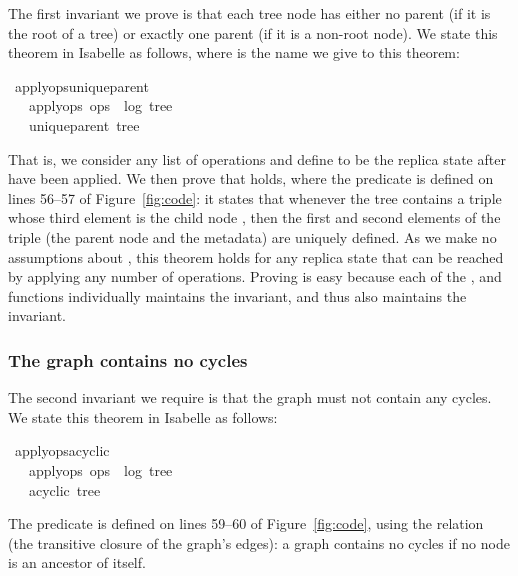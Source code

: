 \documentclass[sigconf]{acmart}
\renewenvironment{isabelle}{%
  \medbreak\noindent%
  \renewcommand{\isanewline}{\\}%
  \begin{minipage}{\columnwidth}%
  \begin{isabellebody}%
  \begin{tabbing}%
}{%
  \end{tabbing}%
  \end{isabellebody}%
  \end{minipage}%
  \medbreak%
}
\renewcommand{\isacartoucheopen}{}
\renewcommand{\isacartoucheclose}{}
\begin{document}
The first invariant we prove is that each tree node has either no parent (if it is the root of a tree) or exactly one parent (if it is a non-root node).
We state this theorem in Isabelle as follows, where  is the name we give to this theorem:
\begin{isabelle}
\isamarkupfalse%
\ apply{\isacharunderscore}ops{\isacharunderscore}unique{\isacharunderscore}parent{\isacharcolon}\isanewline
\ \ \ {\isacartoucheopen}apply{\isacharunderscore}ops\ ops\ {\isacharequal}\ {\isacharparenleft}log{\isacharcomma}\ tree{\isacharparenright}{\isacartoucheclose}\isanewline
\ \ \ {\isacartoucheopen}unique{\isacharunderscore}parent\ tree{\isacartoucheclose}
\end{isabelle}
\noindent That is, we consider any list of operations  and define  to be the replica state after  have been applied.
We then prove that  holds, where the  predicate is defined on lines 56--57 of Figure~\ref{fig:code}: it states that whenever the tree contains a triple whose third element is the child node , then the first and second elements of the triple (the parent node and the metadata) are uniquely defined.
As we make no assumptions about , this theorem holds for any replica state that can be reached by applying any number of operations.
Proving  is easy because each of the ,  and  functions individually maintains the  invariant, and thus  also maintains the invariant.

\subsubsection{The graph contains no cycles}

The second invariant we require is that the graph must not contain any cycles.
We state this theorem in Isabelle as follows:
\begin{isabelle}
\isamarkupfalse%
\ apply{\isacharunderscore}ops{\isacharunderscore}acyclic{\isacharcolon}\isanewline
\ \ \ {\isacartoucheopen}apply{\isacharunderscore}ops\ ops\ {\isacharequal}\ {\isacharparenleft}log{\isacharcomma}\ tree{\isacharparenright}{\isacartoucheclose}\isanewline
\ \ \ {\isacartoucheopen}acyclic\ tree{\isacartoucheclose}
\end{isabelle}
\noindent The  predicate is defined on lines 59--60 of Figure~\ref{fig:code}, using the  relation (the transitive closure of the graph's edges): a graph contains no cycles if no node is an ancestor of itself.
\end{document}
